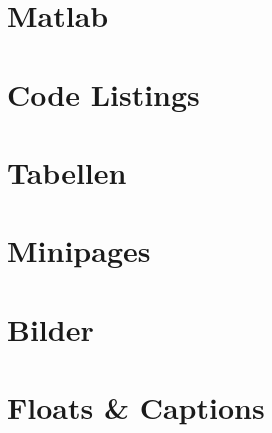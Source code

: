 \documentclass{beamer}                %
\begin{document}
\section<handout:0>{Matlab} %

\section<handout:0>{Code Listings} %

\section<handout:0>{Tabellen} %

\section<handout:0>{Minipages} %

\section<handout:0>{Bilder} %

\section<handout:0>{Floats \& Captions} %
\end{document}
